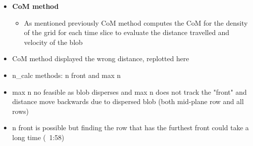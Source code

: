 \documentclass{article}
\begin{document}
\begin{arrowlist}
\begin{itemize}
            \item \textbf{CoM method}
            \begin{itemize}
                \item As mentioned previously CoM method computes the CoM for the density of the grid for each time slice to evaluate the distance travelled and velocity of the blob
            \end{itemize}
            \item CoM method displayed the wrong distance, replotted here
            \item n\_calc methods: n front and max n
            \item max n no feasible as blob disperses and max n does not track the "front" and distance move backwards due to dispersed blob (both mid-plane row and all rows)
            \item n front is possible but finding the row that has the furthest front could take a long time (~1:58)
        \end{itemize}
    
\end{arrowlist}



\nocite{*}
\printbibliography[title={References}]
\end{document}
